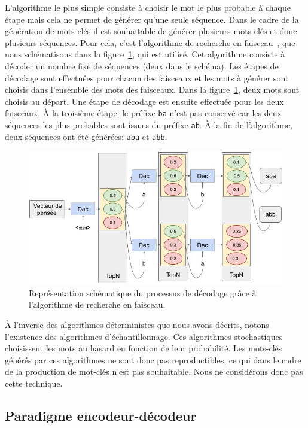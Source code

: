 L'algorithme le plus simple consiste à choisir le mot le plus probable à chaque étape mais cela ne permet de générer qu'une seule séquence.
%
Dans le cadre de la génération de mots-clés il est souhaitable de générer plusieurs mots-clés et donc plusieurs séquences.
Pour cela, c'est l'algorithme de recherche en faisceau~\cite{ow_filtered_1988}, que nous schématisons dans la figure~\ref{fig:beam_search}, qui est utilisé.
Cet algorithme consiste à décoder un nombre fixe de séquences (deux dans le schéma).
Les étapes de décodage sont effectuées pour chacun des faisceaux et les mots à générer sont choisis dans l'ensemble des mots des faisceaux.
Dans la figure~\ref{fig:beam_search}, deux mots sont choisis au départ.
Une étape de décodage est ensuite effectuée pour les deux faisceaux.
\`A la troisième étape, le préfixe \texttt{ba} n'est pas conservé car les deux séquences les plus probables sont issues du préfixe \texttt{ab}.
\`A la fin de l'algorithme, deux séquences ont été générées: \texttt{aba} et \texttt{abb}.

\begin{figure}[ht!]
    \centering
    \includegraphics[scale=0.4]{2_production_mots_cles/Beam Search.jpg}
    \caption{Représentation schématique du processus de décodage grâce à l'algorithme de recherche en faisceau.}
    \label{fig:beam_search}
\end{figure}

\`A l'inverse des algorithmes déterministes que nous avons décrits, notons l'existence des algorithmes d'échantillonnage. Ces algorithmes stochastiques choisissent les mots au hasard en fonction de leur probabilité. Les mots-clés générés par ces algorithmes ne sont donc pas reproductibles, ce qui dans le cadre de la production de mot-clés n'est pas souhaitable. Nous ne considérons donc pas cette technique.

\subsection{Paradigme encodeur-décodeur}\label{sub:paradigme_encodeur_decodeur}

